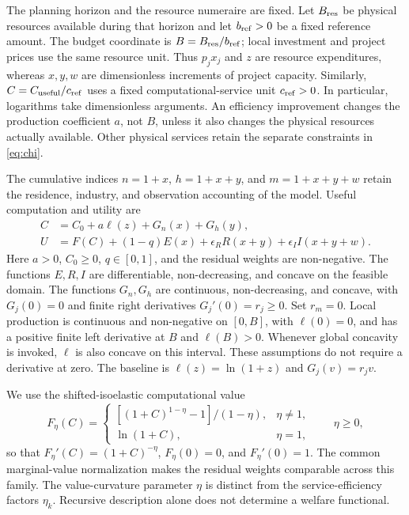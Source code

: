 \label{sec:production}

The planning horizon and the resource numeraire are fixed. Let
$B_{\rm res}$ be physical resources available during that horizon and let
$b_{\rm ref}>0$ be a fixed reference amount. The budget coordinate is
$B=B_{\rm res}/b_{\rm ref}$; local investment and project prices use the
same resource unit. Thus $p_jx_j$ and $z$ are resource expenditures, whereas
$x,y,w$ are dimensionless increments of project capacity. Similarly,
$C=C_{\rm useful}/c_{\rm ref}$ uses a fixed computational-service unit
$c_{\rm ref}>0$. In particular, logarithms take dimensionless arguments.
An efficiency improvement changes the production coefficient $a$, not
$B$, unless it also changes the physical resources actually available.
Other physical services retain the separate constraints in \cref{eq:chi}.

The cumulative indices $n=1+x$, $h=1+x+y$, and $m=1+x+y+w$ retain the
residence, industry, and observation accounting of the model. Useful
computation and utility are
\begin{align}
 C&=C_0+a\ell(z)+G_n(x)+G_h(y),\label{eq:compute}\\
 U&=F(C)+(1-q)E(x)+\epsilon_RR(x+y)
       +\epsilon_II(x+y+w).\label{eq:utility}
\end{align}
Here $a>0$, $C_0\geq0$, $q\in[0,1]$, and the residual weights are
non-negative. The functions $E,R,I$ are differentiable, non-decreasing,
and concave on the feasible domain. The functions $G_n,G_h$ are
continuous, non-decreasing, and concave, with $G_j(0)=0$ and finite right
derivatives $G_j'(0)=r_j\geq0$. Set $r_m=0$. Local production is continuous
and non-negative on $[0,B]$, with $\ell(0)=0$, and has a positive finite
left derivative at $B$ and $\ell(B)>0$. Whenever global concavity is
invoked, $\ell$ is also concave on this interval. These assumptions do
not require a derivative at zero. The baseline is
$\ell(z)=\ln(1+z)$ and $G_j(v)=r_jv$.

We use the shifted-isoelastic computational value
\begin{equation}
 F_\eta(C)=
 \begin{cases}
 [(1+C)^{1-\eta}-1]/(1-\eta),&\eta\ne1,\\
 \ln(1+C),&\eta=1,
 \end{cases}
 \qquad \eta\geq0,
 \label{eq:isoelastic}
\end{equation}
so that $F_\eta'(C)=(1+C)^{-\eta}$, $F_\eta(0)=0$, and
$F_\eta'(0)=1$. The common marginal-value normalization makes the
residual weights comparable across this family. The value-curvature
parameter $\eta$ is distinct from the service-efficiency factors $\eta_k$.
Recursive description alone does not determine a welfare functional.

